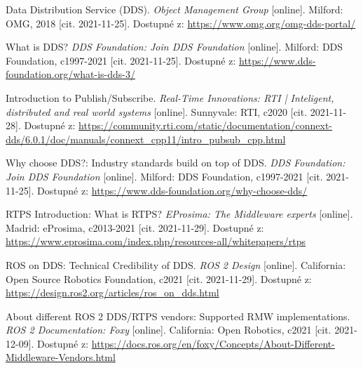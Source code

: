 \begin{thebibliography}{99}
Data Distribution Service (DDS). \textit{Object Management Group} [online]. Milford: OMG, 2018 [cit. 2021-11-25]. Dostupné z: \href{https://www.omg.org/omg-dds-portal/}{https://www.omg.org/omg-dds-portal/}

What is DDS? \textit{DDS Foundation: Join DDS Foundation} [online]. Milford: DDS Foundation, c1997-2021 [cit. 2021-11-25]. Dostupné z: \href{https://www.dds-foundation.org/what-is-dds-3/}{https://www.dds-foundation.org/what-is-dds-3/}

Introduction to Publish/Subscribe. \textit{Real-Time Innovations: RTI | Inteligent, distributed and real world systems} [online]. Sunnyvale: RTI, c2020 [cit. 2021-11-28]. Dostupné z: \href{https://community.rti.com/static/documentation/connext-dds/6.0.1/doc/manuals/connext\_dds/getting\_started/cpp11/intro\_pubsub\_cpp.html}{https://community.rti.com/static/documentation/connext-dds/6.0.1/doc/manuals/connext\_cpp11/intro\_pubsub\_cpp.html}

Why choose DDS?: Industry standards build on top of DDS. \textit{DDS Foundation: Join DDS Foundation} [online]. Milford: DDS Foundation, c1997-2021 [cit. 2021-11-25]. Dostupné z: \href{https://www.dds-foundation.org/why-choose-dds/}{https://www.dds-foundation.org/why-choose-dds/}

RTPS Introduction: What is RTPS? \textit{EProsima: The Middleware experts} [online]. Madrid: eProsima, c2013-2021 [cit. 2021-11-29]. Dostupné z: \href{https://www.eprosima.com/index.php/resources-all/whitepapers/rtps}{https://www.eprosima.com/index.php/resources-all/whitepapers/rtps}

ROS on DDS: Technical Credibility of DDS. \textit{ROS 2 Design} [online]. California: Open Source Robotics Foundation, c2021 [cit. 2021-11-29]. Dostupné z: \href{https://design.ros2.org/articles/ros\_on\_dds.html}{https://design.ros2.org/articles/ros\_on\_dds.html}


About different ROS 2 DDS/RTPS vendors: Supported RMW implementations. \textit{ROS 2 Documentation: Foxy} [online]. California: Open Robotics, c2021 [cit. 2021-12-09]. Dostupné z: \href{https://docs.ros.org/en/foxy/Concepts/About-Different-Middleware-Vendors.html}{https://docs.ros.org/en/foxy/Concepts/About-Different-Middleware-Vendors.html}



\end{thebibliography}
